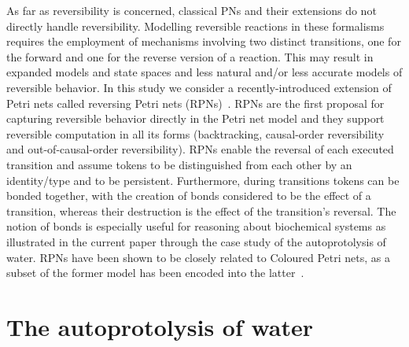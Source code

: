 \documentclass[runningheads]{llncs}
\begin{document}
As far as reversibility is concerned, classical PNs and their extensions do not
directly handle reversibility. Modelling reversible reactions in these formalisms requires the employment
of mechanisms involving two distinct transitions,
one for the forward and one for the reverse version of a reaction. This
may result in expanded models and state spaces and less natural and/or less accurate
models of  reversible behavior. In this study we consider
a recently-introduced extension of Petri nets called reversing Petri nets (RPNs)~\cite{RPNs}.
RPNs are the first proposal for capturing reversible behavior directly in the Petri net model
and they support reversible computation in all its forms
(backtracking, causal-order reversibility and out-of-causal-order reversibility).
RPNs  enable the reversal of each executed transition and assume tokens to be distinguished from each 
other by an identity/type and to be persistent. Furthermore,
during transitions tokens can be bonded together, with  the creation of bonds
 considered to be the effect of a transition, whereas their destruction is the effect of
the transition's reversal. The notion of bonds is especially useful for reasoning about biochemical
systems as illustrated in the current paper through the case study of the autoprotolysis of water.
RPNs have been shown to be closely related to Coloured Petri nets, as a subset of the former model
has been encoded into the latter~\cite{RPNtoCPN}.

\section{The autoprotolysis of water}
\end{document}

